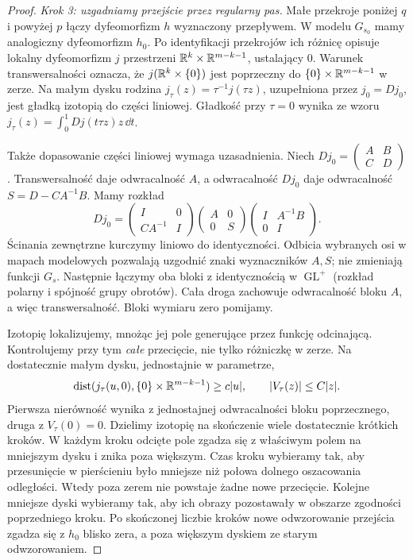 \begin{proof}
\emph{Krok 3: uzgadniamy przejście przez regularny pas.}
Małe przekroje poniżej $q$ i powyżej $p$ łączy
dyfeomorfizm $h$ wyznaczony przepływem.
W modelu $G_{s_0}$ mamy analogiczny dyfeomorfizm $h_0$.
Po identyfikacji przekrojów ich różnicę opisuje lokalny
dyfeomorfizm $j$ przestrzeni $\mathbb{R}^k\times\mathbb{R}^{m-k-1}$,
ustalający $0$. Warunek transwersalności oznacza,
że $j(\mathbb{R}^k\times\{0\})$ jest poprzeczny do
$\{0\}\times\mathbb{R}^{m-k-1}$ w zerze.
Na małym dysku rodzina $j_\tau(z)=\tau^{-1}j(\tau z)$,
uzupełniona przez $j_0=Dj_0$, jest gładką izotopią
do części liniowej. Gładkość przy $\tau=0$ wynika ze wzoru
$j_\tau(z)=\int_0^1 Dj(t\tau z)z\,\dd t$.

Także dopasowanie części liniowej wymaga uzasadnienia.
Niech $Dj_0=\left(\begin{smallmatrix}A&B\\C&D\end{smallmatrix}\right)$.
Transwersalność daje odwracalność $A$, a odwracalność
$Dj_0$ daje odwracalność $S=D-CA^{-1}B$.
Mamy rozkład
\[
 Dj_0=
 \begin{pmatrix}I&0\\CA^{-1}&I\end{pmatrix}
 \begin{pmatrix}A&0\\0&S\end{pmatrix}
 \begin{pmatrix}I&A^{-1}B\\0&I\end{pmatrix}.
\]
Ścinania zewnętrzne kurczymy liniowo do identyczności.
Odbicia wybranych osi w mapach modelowych pozwalają
uzgodnić znaki wyznaczników $A,S$; nie zmieniają funkcji $G_s$.
Następnie łączymy oba bloki z identycznością w
$\operatorname{GL}^+$ (rozkład polarny i spójność grupy
obrotów). Cała droga zachowuje odwracalność bloku $A$,
a więc transwersalność. Bloki wymiaru zero pomijamy.

Izotopię lokalizujemy, mnożąc jej pole generujące
przez funkcję odcinającą. Kontrolujemy przy tym
\emph{całe} przecięcie, nie tylko różniczkę w zerze.
Na dostatecznie małym dysku, jednostajnie w parametrze,
\[
 \operatorname{dist}(j_\tau(u,0),\{0\}\times\mathbb{R}^{m-k-1})
       \geq c|u|,\qquad |V_\tau(z)|\leq C|z|.
\]
Pierwsza nierówność wynika z jednostajnej odwracalności
bloku poprzecznego, druga z $V_\tau(0)=0$.
Dzielimy izotopię na skończenie wiele dostatecznie
krótkich kroków. W każdym kroku odcięte pole zgadza się
z właściwym polem na mniejszym dysku i znika poza większym.
Czas kroku wybieramy tak, aby przesunięcie w pierścieniu
było mniejsze niż połowa dolnego oszacowania odległości.
Wtedy poza zerem nie powstaje żadne nowe przecięcie.
Kolejne mniejsze dyski wybieramy tak, aby ich obrazy
pozostawały w obszarze zgodności poprzedniego kroku.
Po skończonej liczbie kroków nowe odwzorowanie przejścia
zgadza się z $h_0$ blisko zera, a poza większym dyskiem
ze starym odwzorowaniem.


\end{proof}
